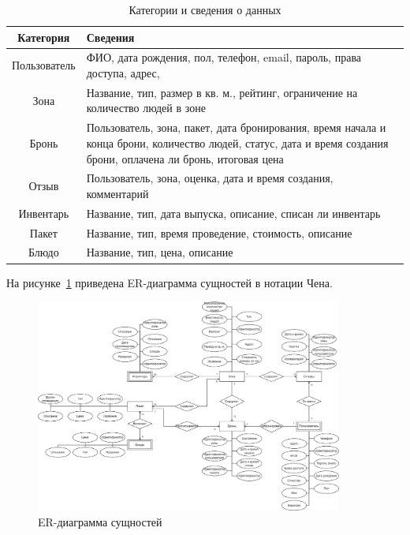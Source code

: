 \begin{table}[ht]
	\begin{center}
		\begin{threeparttable}
			\caption{\label{tb:data} Категории и сведения о данных}
			\begin{tabular}{|c|p{10cm}|}
				\hline
				\textbf{Категория} & \textbf{Сведения} \\ \hline
				Пользователь & ФИО, дата рождения, пол, телефон, email, пароль, права доступа, адрес, \\ \hline
				Зона & Название, тип, размер в кв. м., рейтинг, ограничение на количество людей в зоне \\ \hline
				Бронь & Пользователь, зона, пакет, дата бронирования, время начала и конца брони, количество людей, статус, дата и время создания брони, оплачена ли бронь, итоговая цена \\ \hline
				Отзыв & Пользователь, зона, оценка, дата и время создания, комментарий  \\ \hline
				Инвентарь & Название, тип, дата выпуска, описание, списан ли инвентарь \\ \hline
				Пакет & Название, тип, время проведение, стоимость, описание \\ \hline
				Блюдо & Название, тип, цена, описание \\ \hline
			\end{tabular}
		\end{threeparttable}
	\end{center}
\end{table}

\clearpage

На рисунке~\ref{fig:er} приведена ER-диаграмма сущностей в нотации Чена.

\begin{figure}[h]
	\centering
	\includegraphics[width=0.9\textwidth]{img/er.png}
	\caption{ER-диаграмма сущностей}
	\label{fig:er}
\end{figure}

